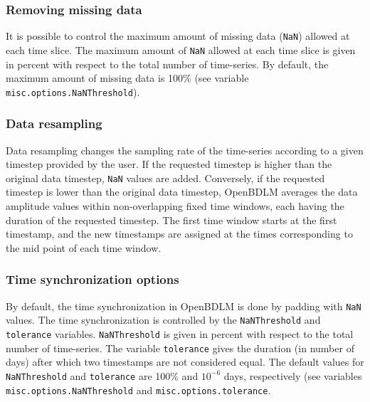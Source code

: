 \subsubsection{Removing missing data}
\label{SS:MissingDataRemoval}

It is possible to control the maximum amount of missing data (\lstinline[basicstyle = \mlttfamily \small ]!NaN!) allowed at each time slice. 
The maximum amount of \lstinline[basicstyle = \mlttfamily \small ]!NaN! allowed at each time slice is given in percent with respect to the total number of time-series.
By default, the maximum amount of missing data is 100\% (see variable \lstinline[basicstyle = \mlttfamily \small ]!misc.options.NaNThreshold!).

\subsubsection{Data resampling}
\label{SS:DataResampling}
Data resampling changes the sampling rate of the time-series according to a given timestep provided by the user. 
If the requested timestep is higher than the original data timestep, \lstinline[basicstyle = \mlttfamily \small ]!NaN! values are added.
Conversely, if the requested timestep is lower than the original  data timestep, OpenBDLM averages the data amplitude values within non-overlapping fixed time windows, each having the duration of the requested timestep.
The first time window starts at the first timestamp, and the new timestamps are assigned at the times corresponding to the mid point of each time window.

\subsubsection{Time synchronization options}
\label{SS:synchronization}
By default, the time synchronization in OpenBDLM is done by padding with \lstinline[basicstyle = \mlttfamily \small ]!NaN! values.
The time synchronization is controlled by the \lstinline[basicstyle = \mlttfamily \small ]!NaNThreshold! and \lstinline[basicstyle = \mlttfamily \small ]!tolerance! variables.
\lstinline[basicstyle = \mlttfamily \small ]!NaNThreshold!  is given in percent with respect to the total number of time-series.
The variable \lstinline[basicstyle = \mlttfamily \small ]!tolerance! gives the duration (in number of days) after which two timestamps are not considered equal.
The default values for \lstinline[basicstyle = \mlttfamily \small ]!NaNThreshold!  and \lstinline[basicstyle = \mlttfamily \small ]!tolerance! are 100\% and $10^{-6}$ days, respectively (see variables \lstinline[basicstyle = \mlttfamily \small ]!misc.options.NaNThreshold! and \lstinline[basicstyle = \mlttfamily \small ]!misc.options.tolerance!. %

